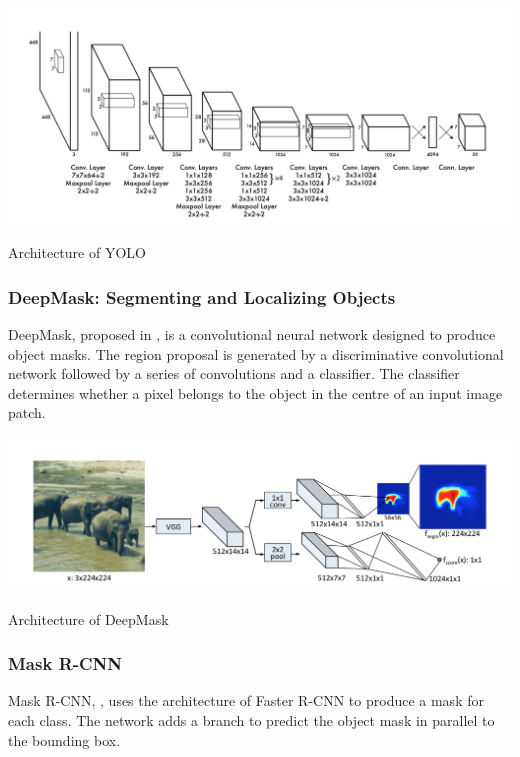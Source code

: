 \begin{table}[!ht]
  \includegraphics[width=\textwidth]{figs/yolo.png}
  \caption{Architecture of YOLO}
  \label{fig:yolo}
\end{table}


\subsubsection{DeepMask: Segmenting and Localizing Objects}
DeepMask, proposed in \cite{DBLP:journals/corr/PinheiroCD15}, is a convolutional neural network designed to produce object masks.
The region proposal is generated by a discriminative convolutional network followed by a series of convolutions and a classifier.
The classifier determines whether a pixel belongs to the object in the centre of an input image patch.

\begin{table}[!ht]
  \includegraphics[width=\textwidth]{figs/deepmsk.png}
  \caption{Architecture of DeepMask}
  \label{fig:deepmsk}
\end{table}


\subsubsection{Mask R-CNN}
Mask R-CNN, \cite{DBLP:journals/corr/HeGDG17}, uses the architecture of Faster R-CNN to produce a mask for each class.
The network adds a branch to predict the object mask in parallel to the bounding box.

